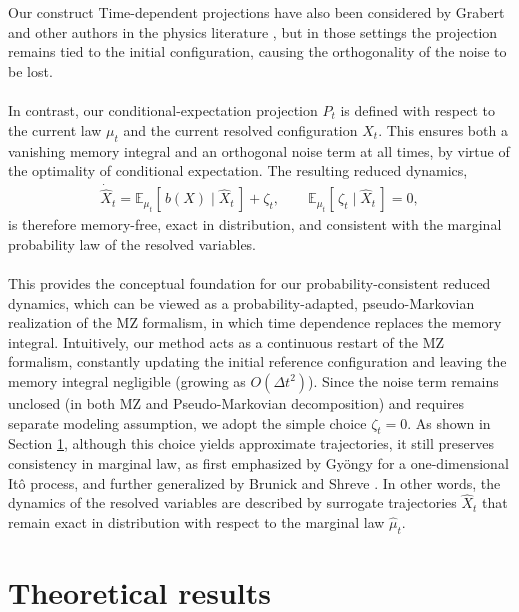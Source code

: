 \documentclass[11pt, a4paper, oneside, reqno]{amsart}
\makeatletter
\def\subsection{\@startsection{subsection}{2}%
	\z@{.5\linespacing\@plus.7\linespacing}{.5\linespacing}%
	{\normalfont\large\bfseries}}
\makeatother
\begin{document}
\subsection{Our construct}  
\noindent Time-dependent projections have also been considered by Grabert \cite{grabert1982proj} and other authors in the physics literature \cite{_ttinger_2005,Vrugt_2020}, but in those settings the projection remains tied to the initial configuration, causing the orthogonality of the noise to be lost.  \\ \ \\ 
In contrast, our conditional-expectation projection $P_t$ is defined with respect to the {current law} $\mu_t$ and the {current resolved configuration} $\hat{X}_t$. This ensures both a vanishing memory integral  and an orthogonal noise term at all times, by virtue of the optimality of conditional expectation.  The resulting reduced dynamics,
\begin{eqnarray}\label{eq:our construct}
\dot{\hat{X}}_t = \mathbb{E}_{\mu_t}[\,{b}(X)\mid \hat{X}_t\,] +\zeta_t, 
\qquad \mathbb{E}_{\mu_t}[\,\zeta_t\mid \hat{X}_t\,]=0,
\end{eqnarray}
is therefore memory-free, exact in distribution, and consistent with the marginal probability law of the resolved variables. 
\\ \ \\
 This provides the conceptual foundation for our probability-consistent reduced dynamics, which can be viewed as a probability-adapted, pseudo-Markovian realization of the MZ formalism, in which time dependence replaces the memory integral. 
 Intuitively, our method acts as a continuous restart of the MZ formalism, constantly updating the initial reference configuration and leaving the memory integral negligible (growing as $O(\Delta t^2)$).
 Since the noise term remains unclosed (in both MZ and Pseudo-Markovian decomposition) and requires separate modeling assumption, we adopt the simple choice $\zeta_t=0$.  As shown in Section \ref{sec:optimal proba consitstent reduced dynamics}, although this choice yields approximate trajectories, it still preserves consistency in marginal law, as first emphasized by Gyöngy \cite{gyongy1986mimicking} for a one-dimensional Itô process, and further generalized by Brunick and Shreve \cite{brunick2013mimicking}. In other words, the dynamics of the resolved variables are described by surrogate trajectories $\hat{X}_t$ that remain exact in distribution with respect to the marginal law $\hat{\mu}_t$.
\section{Theoretical results}\label{sec:optimal proba consitstent reduced dynamics}
\end{document}
